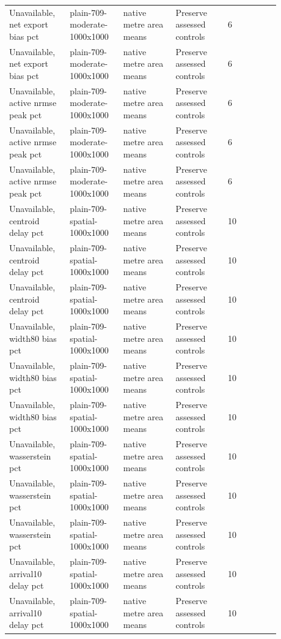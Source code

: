\begin{longtable}{p{0.1760\linewidth}p{0.1760\linewidth}p{0.1760\linewidth}p{0.1760\linewidth}p{0.1760\linewidth}}
Unavailable, net export bias pct & plain-709-moderate-1000x1000 & native metre area means & Preserve assessed controls & 6 \\
Unavailable, net export bias pct & plain-709-moderate-1000x1000 & native metre area means & Preserve assessed controls & 6 \\
Unavailable, active nrmse peak pct & plain-709-moderate-1000x1000 & native metre area means & Preserve assessed controls & 6 \\
Unavailable, active nrmse peak pct & plain-709-moderate-1000x1000 & native metre area means & Preserve assessed controls & 6 \\
Unavailable, active nrmse peak pct & plain-709-moderate-1000x1000 & native metre area means & Preserve assessed controls & 6 \\
Unavailable, centroid delay pct & plain-709-spatial-1000x1000 & native metre area means & Preserve assessed controls & 10 \\
Unavailable, centroid delay pct & plain-709-spatial-1000x1000 & native metre area means & Preserve assessed controls & 10 \\
Unavailable, centroid delay pct & plain-709-spatial-1000x1000 & native metre area means & Preserve assessed controls & 10 \\
Unavailable, width80 bias pct & plain-709-spatial-1000x1000 & native metre area means & Preserve assessed controls & 10 \\
Unavailable, width80 bias pct & plain-709-spatial-1000x1000 & native metre area means & Preserve assessed controls & 10 \\
Unavailable, width80 bias pct & plain-709-spatial-1000x1000 & native metre area means & Preserve assessed controls & 10 \\
Unavailable, wasserstein pct & plain-709-spatial-1000x1000 & native metre area means & Preserve assessed controls & 10 \\
Unavailable, wasserstein pct & plain-709-spatial-1000x1000 & native metre area means & Preserve assessed controls & 10 \\
Unavailable, wasserstein pct & plain-709-spatial-1000x1000 & native metre area means & Preserve assessed controls & 10 \\
Unavailable, arrival10 delay pct & plain-709-spatial-1000x1000 & native metre area means & Preserve assessed controls & 10 \\
Unavailable, arrival10 delay pct & plain-709-spatial-1000x1000 & native metre area means & Preserve assessed controls & 10 \\

\end{longtable}
